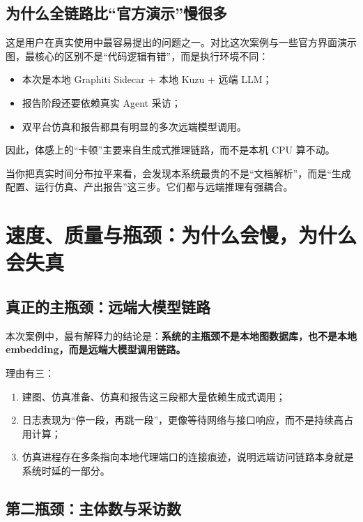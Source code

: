 \documentclass[UTF8,10pt,oneside]{ctexbook}
\begin{document}
\section{为什么全链路比“官方演示”慢很多}

这是用户在真实使用中最容易提出的问题之一。对比这次案例与一些官方界面演示图，最核心的区别不是“代码逻辑有错”，而是执行环境不同：

\begin{itemize}
  \item 本次是本地 Graphiti Sidecar + 本地 Kuzu + 远端 LLM；
  \item 报告阶段还要依赖真实 Agent 采访；
  \item 双平台仿真和报告都具有明显的多次远端模型调用。
\end{itemize}

因此，体感上的“卡顿”主要来自生成式推理链路，而不是本机 CPU 算不动。

\begin{takeawaybox}[本章核心结论]
当你把真实时间分布拉平来看，会发现本系统最贵的不是“文档解析”，而是“生成配置、运行仿真、产出报告”这三步。它们都与远端推理有强耦合。
\end{takeawaybox}

\chapter{速度、质量与瓶颈：为什么会慢，为什么会失真}

\section{真正的主瓶颈：远端大模型链路}

本次案例中，最有解释力的结论是：\textbf{系统的主瓶颈不是本地图数据库，也不是本地 embedding，而是远端大模型调用链路。}

理由有三：

\begin{enumerate}
  \item 建图、仿真准备、仿真和报告这三段都大量依赖生成式调用；
  \item 日志表现为“停一段，再跳一段”，更像等待网络与接口响应，而不是持续高占用计算；
  \item 仿真进程存在多条指向本地代理端口的连接痕迹，说明远端访问链路本身就是系统时延的一部分。
\end{enumerate}

\section{第二瓶颈：主体数与采访数}
\end{document}

